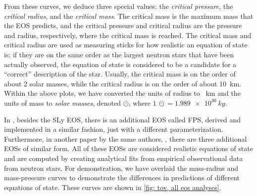 From these curves, we deduce three special values: the \textit{critical pressure}, the \textit{critical radius}, and the \textit{critical mass}. The critical mass is the maximum mass that the EOS predicts, and the critical pressure and critical radius are the pressure and radius, respectively, where the critical mass is reached. The critical mass and critical radius are used as measuring sticks for how realistic an equation of state is; if they are on the same order as the largest neutron stars that have been actually observed, the equation of state is considered to be a candidate for a ``correct'' description of the star. Usually, the critical mass is on the order of about 2 solar masses, while the critical radius is on the order of about \SI{10}{km}. Within the above plots, we have converted the units of radius to \SI{}{km} and the units of mass to \textit{solar masses}, denoted $\odot$, where $\SI{1}{\odot} = \SI{1.989e+30}{kg}.$

In \autocite{SLy_2004}, besides the SLy EOS, there is an additional EOS called FPS, derived and implemented in a similar fashion, just with a different parameterization. Furthermore, in another paper by the same authors, \autocite{BSk_2013}, there are three additional EOSs of similar form. All of these EOSs are considered realistic equations of state and are computed by creating analytical fits from empirical observational data from neutron stars. For demonstration, we have overlaid the mass-radius and mass-pressure curves to demonstrate the differences in predictions of different equations of state. These curves are shown in \autoref{fig: tov, all eos analyses}.

